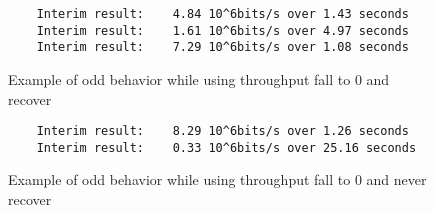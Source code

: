     \begin{figure}[bthp]
    \begin{lstlisting}
    Interim result:    4.84 10^6bits/s over 1.43 seconds
    Interim result:    1.61 10^6bits/s over 4.97 seconds
    Interim result:    7.29 10^6bits/s over 1.08 seconds
    \end{lstlisting}
    \caption{Example of odd behavior while using \olsr\: throughput fall
      to 0 and recover}
    \label{lst:netperf-olsr-recover}
    \end{figure}

    \begin{figure}[bthp]
    \begin{lstlisting}
    Interim result:    8.29 10^6bits/s over 1.26 seconds
    Interim result:    0.33 10^6bits/s over 25.16 seconds
    \end{lstlisting}
    \caption{Example of odd behavior while using \olsr\: throughput fall
      to 0 and never recover}
    \label{lst:netperf-olsr-zero}
    \end{figure}
